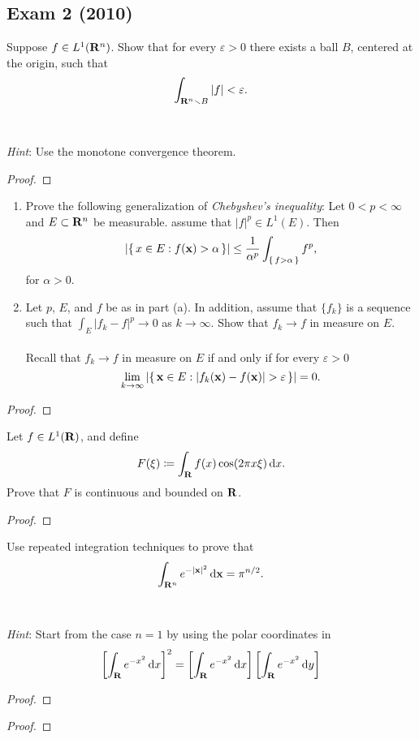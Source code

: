 \subsection{Exam 2 (2010)}
\begin{problem}
Suppose $f\in L^1(\mathbf{R}^n)$. Show that for every $\varepsilon>0$ there
exists a ball $B$, centered at the origin, such that
\[
\int_{\mathbf{R}^n\smallsetminus B}|f|<\varepsilon.
\]
\\\\
\emph{Hint}: Use the monotone convergence theorem.
\end{problem}
\begin{proof}
\end{proof}
\begin{problem}
\begin{enumerate}[label=(\alph*)]
\item Prove the following generalization of \emph{Chebyshev's inequality}:
  Let $0<p<\infty$ and $E\subset\mathbf{R}^n$ be measurable. assume that
  $|f|^p\in L^1(E)$. Then
\[
\left|\left\{\,x\in E:f(\mathbf{x})>\alpha\,\right\}\right|
\leq\frac{1}{\alpha^p}\int_{\left\{\,f>\alpha\,\right\}}f^p,
\]
for $\alpha>0$.
\item Let $p$, $E$, and $f$ be as in part (a). In addition, assume that
  $\{f_k\}$ is a sequence such that $\int_E|f_k-f|^p\to 0$ as
  $k\to\infty$. Show that $f_k\to f$ in measure on $E$.
\\\\
Recall that $f_k\to f$ in measure on $E$ if and only if for every
$\varepsilon>0$
\[
\lim_{k\to\infty}\left|\left\{\,\bfx\in
    E:|f_k(\bfx)-f(\bfx)|>\varepsilon\,\right\}\right|=0.
\]
\end{enumerate}
\end{problem}
\begin{proof}
\end{proof}

\begin{problem}
Let $f\in L^1(\mathbf{R})$, and define
\[
F(\xi)\coloneqq\int_{\mathbf{R}} f(x)\cos(2\pi x\xi)\mathop{}\!\mathrm{d} x.
\]
Prove that $F$ is continuous and bounded on $\mathbf{R}$.
\end{problem}
\begin{proof}
\end{proof}

\begin{problem}
Use repeated integration techniques to prove that
\[
\int_{\mathbf{R}^n} e^{-|\mathbf{x}|^2}\mathop{}\!\mathrm{d}\mathbf{x}=\pi^{n/2}.
\]
\\\\
\emph{Hint}: Start from the case $n=1$ by using the polar coordinates in
\[
\left[\int_{\mathbf{R}} e^{-x^2}\mathop{}\!\mathrm{d} x\right]^2=
\left[\int_{\mathbf{R}} e^{-x^2}\mathop{}\!\mathrm{d} x\right]
\left[\int_{\mathbf{R}} e^{-x^2}\mathop{}\!\mathrm{d} y\right]
\]
\end{problem}
\begin{proof}
\end{proof}

\begin{problem}
\end{problem}
\begin{proof}
\end{proof}

